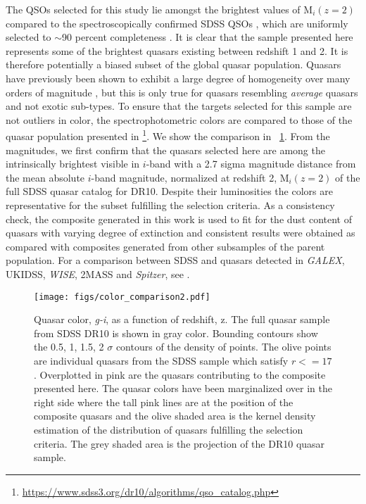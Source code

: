 \documentclass{aa}    %
\newcommand{\figref}[1]{\ref{fig:#1}}
\newcommand{\Fig}[1]{\figurename~\figref{#1}}
\newcommand{\fig}[1]{\Fig{#1}}
\newcommand{\figlabel}[1]{\label{fig:#1}}
\begin{document}
The QSOs selected for this study lie amongst the brightest values of
M$_i(z=2)$ compared to the spectroscopically confirmed SDSS QSOs
\citep{Shen2011}, which are uniformly selected to $\sim$90 percent
completeness \citep{Richards2002, VandenBerk2005}. It is clear that
the sample presented here represents some of the brightest quasars
existing between redshift 1 and 2. It is therefore potentially a
biased subset of the global quasar population. Quasars have previously
been shown to exhibit a large degree of homogeneity over many orders
of magnitude \citep{Dietrich2002}, but this is only true for quasars
resembling \textit{average} quasars and not exotic sub-types. To
ensure that the targets selected for this sample are not outliers in
color, the spectrophotometric colors are compared to those of the
quasar population presented in
\citet{Paris2014}\footnote{\url{https://www.sdss3.org/dr10/algorithms/qso_catalog.php}}.
We
show the comparison in \fig{color_comparison}. From the magnitudes, we
first confirm that the quasars selected here are among the
intrinsically brightest visible in $i$-band with a 2.7 sigma magnitude
distance from the mean absolute $i$-band magnitude, normalized at redshift 2,
M$_i(z=2)$ of the full SDSS quasar catalog for DR10. Despite their luminosities the colors are representative
for the subset fulfilling the selection criteria. As a consistency
check, the composite generated in this work is used to fit for the
dust content of quasars with varying degree of extinction and
consistent results were obtained as compared with composites generated
from other subsamples of the parent population. For a comparison
between SDSS and quasars detected in \textit{GALEX}, UKIDSS,
\textit{WISE}, 2MASS and \textit{Spitzer}, see
\citet{Krawczyk2013}.


 \begin{figure}[t!]
   \centering
   \texttt{[image: figs/color\_comparison2.pdf]}
   \caption[]{Quasar color, \textit{g-i},  as a function of redshift, z. The
full quasar sample from SDSS DR10 \citep{Paris2014} is shown in gray color.
Bounding contours show the 0.5, 1, 1.5, 2 $\sigma$ contours of the density of
points. The olive points are individual quasars from the SDSS sample which
satisfy $r <= 17$. Overplotted in pink are the quasars contributing to the
composite presented here. The quasar colors have been marginalized over in the
right side where the tall pink lines are at the position of the composite
quasars and the olive shaded area is the kernel density estimation of the
distribution of quasars fulfilling the selection criteria. The grey shaded area
is the projection of the DR10 quasar sample.}
  \figlabel{color_comparison}
 \end{figure}
\end{document}
